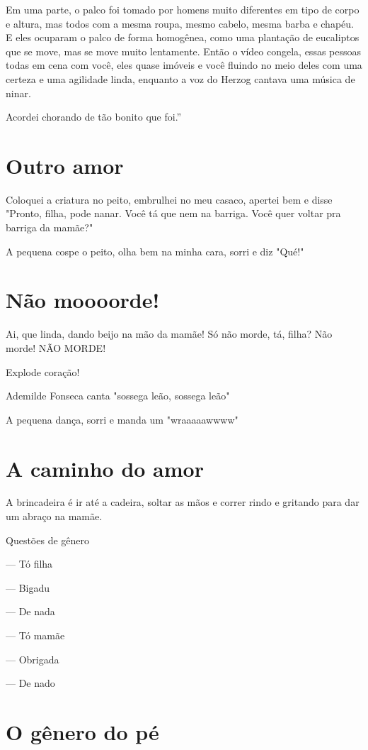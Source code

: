 Em uma parte, o palco foi tomado por homens muito diferentes em tipo de
corpo e altura, mas todos com a mesma roupa, mesmo cabelo, mesma barba e
chapéu. E eles ocuparam o palco de forma homogênea, como uma plantação
de eucaliptos que se move, mas se move muito lentamente. Então o vídeo
congela, essas pessoas todas em cena com você, eles quase imóveis e você
fluindo no meio deles com uma certeza e uma agilidade linda, enquanto a
voz do Herzog cantava uma música de ninar.

Acordei chorando de tão bonito que foi.''

\chapter{Outro amor}

Coloquei a criatura no peito, embrulhei no meu casaco, apertei bem e
disse "Pronto, filha, pode nanar. Você tá que nem na barriga. Você quer
voltar pra barriga da mamãe?"

A pequena cospe o peito, olha bem na minha cara, sorri e diz "Qué!"

\chapter{Não moooorde!}

Ai, que linda, dando beijo na mão da mamãe! Só não morde, tá, filha? Não
morde! NÃO MORDE!

Explode coração!

Ademilde Fonseca canta "sossega leão, sossega leão"

A pequena dança, sorri e manda um "wraaaaawwww"

\chapter{A caminho do amor}

A brincadeira é ir até a cadeira, soltar as mãos e correr rindo e
gritando para dar um abraço na mamãe.

Questões de gênero

— Tó filha

— Bigadu

— De nada

— Tó mamãe

— Obrigada

— De nado

\chapter{O gênero do pé}

